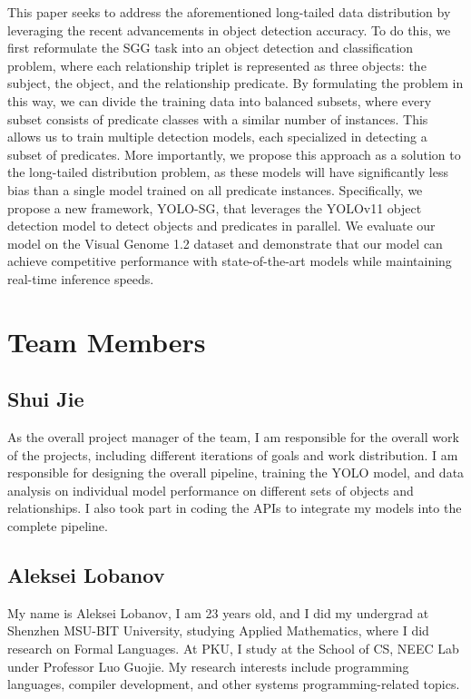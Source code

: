 \documentclass{article}
\begin{document}
This paper seeks to address the aforementioned long-tailed data distribution by leveraging the recent advancements in object detection accuracy. To do this, we first reformulate the SGG task into an object detection and classification problem, where each relationship triplet is represented as three objects: the subject, the object, and the relationship predicate.
By formulating the problem in this way, we can divide the training data into balanced subsets, where every subset consists of predicate classes with a similar number of instances. This allows us to train multiple detection models, each specialized in detecting a subset of predicates. More importantly, we propose this approach as a solution to the long-tailed distribution problem, as these models will have significantly less bias than a single model trained on all predicate instances.
Specifically, we propose a new framework, YOLO-SG, that leverages the YOLOv11 object detection model\cite{redmon2016you} to detect objects and predicates in parallel. We evaluate our model on the Visual Genome 1.2 dataset\cite{krishna2017visual} and demonstrate that our model can achieve competitive performance with state-of-the-art models while maintaining real-time inference speeds.

\section{Team Members}
\subsection*{Shui Jie}
 As the overall project manager of the team, I am responsible for the overall work of the projects, including different iterations of goals and work distribution. I am responsible for designing the overall pipeline, training the YOLO model, and data analysis on individual model performance on different sets of objects and relationships. I also took part in coding the APIs to integrate my models into the complete pipeline.
\subsection*{Aleksei Lobanov}
My name is Aleksei Lobanov, I am 23 years old, and I did my undergrad at Shenzhen MSU-BIT University, studying Applied Mathematics, where I did research on Formal Languages. At PKU, I study at the School of CS, NEEC Lab under Professor Luo Guojie. My research interests include programming languages, compiler development, and other systems programming-related topics. 
\end{document}
